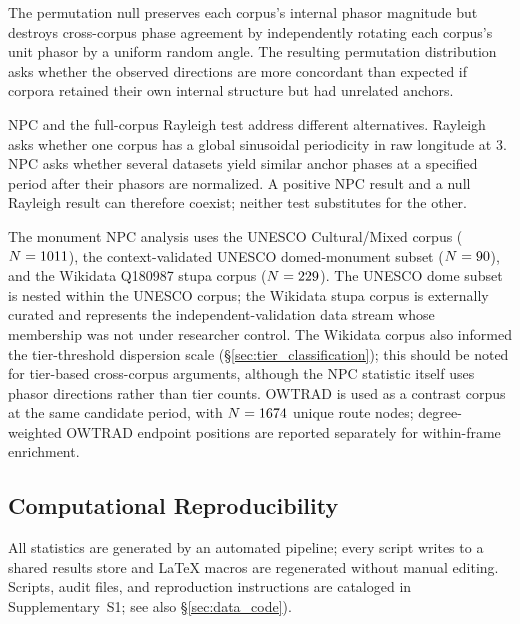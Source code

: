 The permutation null preserves each corpus's internal phasor magnitude
but destroys cross-corpus phase agreement by independently rotating
each corpus's unit phasor by a uniform random angle. The resulting
permutation distribution asks whether the observed directions are more
concordant than expected if corpora retained their own internal
structure but had unrelated anchors.

NPC and the full-corpus Rayleigh test address different alternatives.
Rayleigh asks whether one corpus has a global sinusoidal periodicity in
raw longitude at 3\textdegree{}. NPC asks whether several datasets yield
similar anchor phases at a specified period after their phasors are
normalized. A positive NPC result and a null Rayleigh result can
therefore coexist; neither test substitutes for the other.

The monument NPC analysis uses the UNESCO Cultural/Mixed corpus
($N=1011{}$), the context-validated UNESCO domed-monument subset
($N=90{}$), and the Wikidata Q180987 stupa corpus
($N=229{}$). The UNESCO dome subset is nested within the UNESCO
corpus; the Wikidata stupa corpus is externally curated and represents
the independent-validation data stream whose membership was not under
researcher control.
The Wikidata corpus also informed the tier-threshold dispersion scale
(\S\ref{sec:tier_classification}); this should be noted for tier-based
cross-corpus arguments, although the NPC statistic itself uses phasor
directions rather than tier counts. OWTRAD is used as a contrast corpus
at the same candidate period, with $N=1674{}$ unique route
nodes; degree-weighted OWTRAD endpoint positions are reported
separately for within-frame enrichment.

\subsection{Computational Reproducibility}
\label{sec:scripts}

All statistics are generated by an automated pipeline; every script writes
to a shared results store and LaTeX macros are regenerated without manual
editing. Scripts, audit files, and reproduction instructions are cataloged
in Supplementary~S1; see also \S\ref{sec:data_code}).


